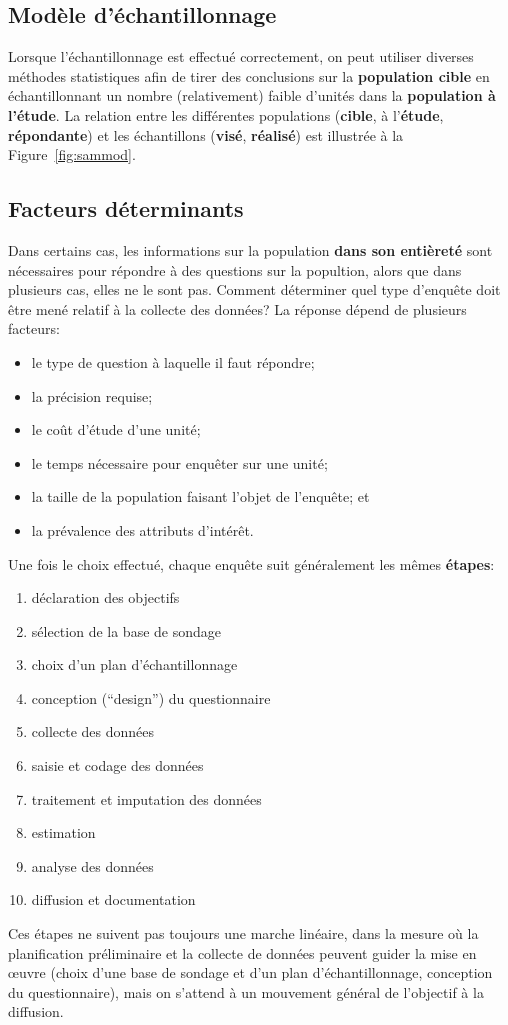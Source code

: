 \subsection{Modèle d'échantillonnage}
Lorsque l'échantillonnage est effectué correctement, on peut utiliser diverses méthodes statistiques afin de tirer des conclusions sur la \textbf{population cible} en échantillonnant un nombre (relativement) faible d'unités dans la \textbf{population à l'étude}. La relation entre les différentes populations (\textbf{cible}, à l'\textbf{étude}, \textbf{répondante}) et les échantillons (\textbf{vis\'e}, \textbf{réalisé}) est illustrée à la Figure~\ref{fig:sammod}. 
\subsection{Facteurs déterminants} Dans certains cas, les informations sur la population \textbf{dans son entièreté} sont nécessaires pour répondre à des questions sur la popultion, alors que dans plusieurs cas, elles ne le sont pas.  Comment déterminer quel type d'enquête doit être mené relatif à la collecte des données? La réponse dépend de plusieurs facteurs: 
\begin{itemize}[noitemsep]
    \item le type de question à laquelle il faut répondre;
\item la précision requise;
\item le coût d'étude d'une unité;
\item le temps nécessaire pour enquêter sur une unité;\item  la taille de la population faisant l'objet de l'enquête; et 
\item la prévalence des attributs d'intérêt.
\end{itemize}
Une fois le choix effectué, chaque enquête suit généralement les mêmes \textbf{étapes}:
\begin{enumerate}[noitemsep]
    \item déclaration des objectifs
    \item sélection de la base de sondage
    \item choix d'un plan d'échantillonnage
    \item conception (``design'') du questionnaire
    \item collecte des données
    \item saisie et codage des données
    \item traitement et imputation des données 
    \item estimation 
    \item analyse des données
    \item diffusion et documentation 
\end{enumerate}
Ces étapes ne suivent pas toujours une marche linéaire, dans la mesure où la planification préliminaire et la collecte de données peuvent guider la mise en œuvre (choix d'une base de sondage et d'un plan d'échantillonnage, conception du questionnaire), mais on s'attend à un mouvement général de l'objectif à la diffusion. 
